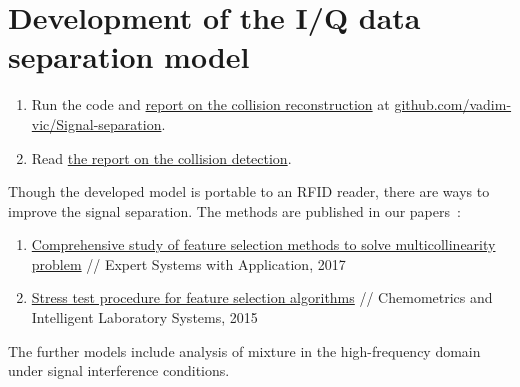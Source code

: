 \documentclass[12pt]{article}
\begin{document}

\section{Development of the I/Q data separation model}
\begin{enumerate}
\item Run the code and \href{https://github.com/vadim-vic/Signal-separation}{report on the collision reconstruction} at \href{https://github.com/vadim-vic/Signal-separation}{github.com/vadim-vic/Signal-separation}. 
\item Read \href{https://github.com/vadim-vic/Signal-separation/blob/main/latex/CollisionDetector.pdf}{the report on the collision detection}.
\end{enumerate}

Though the developed model is portable to an RFID reader, there are ways to improve the signal separation. The methods are published in our papers~\cite{Katrutsa2017,Katrutsa2015}:
\begin{enumerate}
\item \href{https://doi.org/10.1016/j.eswa.2017.01.048}{Comprehensive study of feature selection methods to solve multicollinearity problem} // Expert Systems with Application, 2017
\item \href{https://doi.org/10.1016/j.chemolab.2015.01.018}{Stress test procedure for feature selection algorithms} // Chemometrics and Intelligent Laboratory Systems, 2015
\end{enumerate}

The further models include analysis of mixture in the high-frequency domain under signal interference conditions.



\end{document}
